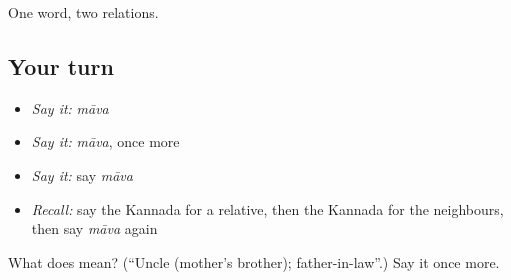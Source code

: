 \begin{grammarlens}[title={What you've built}]
One word, two relations.
\end{grammarlens}

\subsection*{Your turn}
\begin{itemize}
\raggedright
  \item \emph{Say it:} \emph{māva}
  \item \emph{Say it:} \emph{māva}, once more
  \item \emph{Say it:} say \emph{māva}
  \item \emph{Recall:} say the Kannada for a relative, then the Kannada for the neighbours, then say \emph{māva} again
\end{itemize}

\begin{tcolorbox}[breakable,colback=teal!4,colframe=teal!35!black,title={Before you move on}]
What does  mean? (\textquotedblleft{}Uncle (mother's brother); father-in-law\textquotedblright{}.) Say it once more.
\end{tcolorbox}
